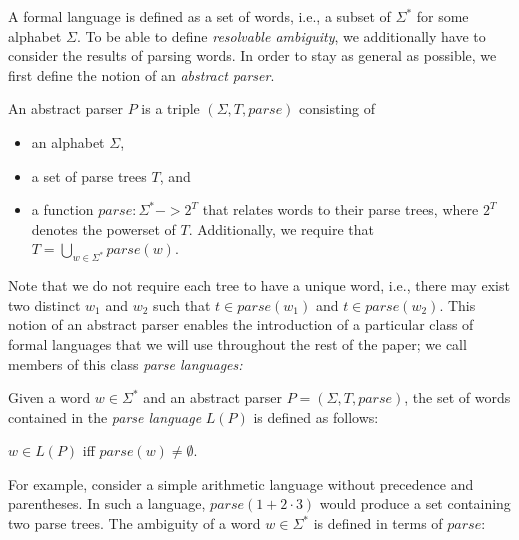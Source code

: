 \documentclass[runningheads]{llncs}
\newcommand{\T}{\Sigma} %
\newcommand{\parse}{\mathit{parse}} %
\begin{document}
A formal language is defined as a set of words, i.e., a subset of $\T^{*}$ for some alphabet $\T$. To be able to define \emph{resolvable ambiguity}, we additionally have to consider the results of parsing words. In order to stay as general as possible, we first define the notion of an \emph{abstract parser}.

\begin{definition}
  An abstract parser $P$ is a triple $(\T, T, \parse)$ consisting of
\begin{itemize}
\item an alphabet $\T$,
\item a set of parse trees $T$, and
\item a function $\parse : \T^{*} -> 2^T$ that relates words to their parse trees, where $2^T$ denotes the powerset of $T$. Additionally, we require that $T = \bigcup_{w \in \T^{*}} \parse(w)$.
\end{itemize}
\end{definition}

\noindent Note that we do not require each tree to have a unique word, i.e., there may exist two distinct $w_1$ and $w_2$ such that $t \in \parse(w_1)$ and $t \in \parse(w_2)$. This notion of an abstract parser enables the introduction of a particular class of formal languages that we will use throughout the rest of the paper; we call members of this class \emph{parse languages:}

\begin{definition}
  Given a word $w \in \T^{*}$ and an abstract parser $P = (\T, T,
  \parse)$, the set of words contained in the \emph{parse language}
  $L(P)$ is defined as follows:

  $w \in L(P)$ iff $\parse(w) \neq \emptyset$.
\end{definition}

\noindent For example, consider a simple arithmetic language without precedence and parentheses. In such a language, $\parse(1 + 2 \cdot 3)$ would produce a set containing two parse trees. %
%
%
The ambiguity of a word $w \in \T^{*}$ is defined in terms of $\parse$:
\end{document}
